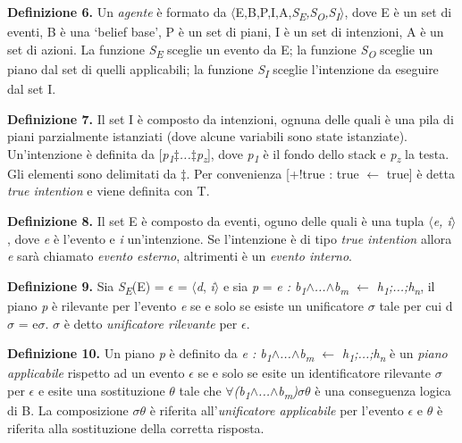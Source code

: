 \smallskip
\textbf{Definizione 6.} Un \textit{agente} \`e formato da $\langle$E,B,P,I,A,\textit{S\textsubscript{E},S\textsubscript{O},S\textsubscript{I}}$\rangle$, dove E \`e un set di eventi, B \`e una `belief base', P \`e un set di piani, I \`e un set di intenzioni, A \`e un set di azioni. La funzione \textit{S\textsubscript{E}} sceglie un evento da E; la funzione \textit{S\textsubscript{O}} sceglie un piano dal set di quelli applicabili; la funzione \textit{S\textsubscript{I}} sceglie l'intenzione da eseguire dal set I.

\smallskip
\textbf{Definizione 7.} Il set I \`e composto da intenzioni, ognuna delle quali \`e una pila di piani parzialmente istanziati (dove alcune variabili sono state istanziate). Un'intenzione \`e definita da [\textit{p\textsubscript{1}$\ddagger$...$\ddagger$p\textsubscript{z}}], dove \textit{p\textsubscript{1}} \`e il fondo dello stack e \textit{p\textsubscript{z}} la testa. Gli elementi sono delimitati da $\ddagger$. Per convenienza [+!true : true $\leftarrow$ true] \`e detta \textit{true intention} e viene definita con T.

\smallskip
\textbf{Definizione 8.} Il set E \`e composto da eventi, oguno delle quali \`e una tupla \textit{$\langle$\textit{e}, \textit{i}$\rangle$}, dove \textit{e} \`e l'evento e \textit{i} un'intenzione. Se l'intenzione \`e di tipo \textit{true intention} allora \textit{e} sar\`a chiamato \textit{evento esterno}, altrimenti \`e un \textit{evento interno}.

\smallskip
\textbf{Definizione 9.} Sia \textit{S\textsubscript{E}}(E) = \textit{$\epsilon$} = $\langle$\textit{d}, \textit{i}$\rangle$ e sia \textit{p} = \textit{e : b\textsubscript{1}$\land$...$\land$b\textsubscript{m} $\leftarrow$ h\textsubscript{1};...;h\textsubscript{n}}, il piano \textit{p} \`e rilevante per l'evento \textit{e} se e solo se esiste un unificatore $\sigma$ tale per cui d$\sigma$ = e$\sigma$. \textit{$\sigma$} \`e detto \textit{unificatore rilevante} per \textit{$\epsilon$}.

\smallskip
\textbf{Definizione 10.} Un piano \textit{p} \`e definito da \textit{e : b\textsubscript{1}$\land$...$\land$b\textsubscript{m} $\leftarrow$ h\textsubscript{1};...;h\textsubscript{n}} \`e un \textit{piano applicabile} rispetto ad un evento \textit{$\epsilon$} se e solo se esite un identificatore rilevante $\sigma$ per \textit{$\epsilon$} e esite una sostituzione \textit{$\theta$} tale che $\forall$\textit{(b\textsubscript{1}$\land$...$\land$b\textsubscript{m})}\textit{$\sigma\theta$} \`e una conseguenza logica di B. La composizione \textit{$\sigma\theta$} \`e riferita all'\textit{unificatore applicabile} per l'evento \textit{$\epsilon$} e \textit{$\theta$} \`e riferita alla sostituzione della corretta risposta.


